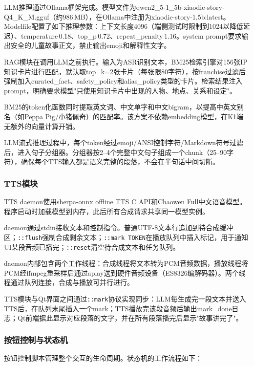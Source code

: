\documentclass[lettersize,journal]{IEEEtran}
\begin{document}
LLM推理通过Ollama框架完成。模型文件为qwen2\_5-1\_5b-xiaodie-story-Q4\_K\_M.gguf（约986\,MB），在Ollama中注册为xiaodie-story-1.5b:latest。Modelfile配置了如下推理参数：上下文长度4096（端侧测试时限制到1024以降低延迟）、temperature\,0.18、top\_p\,0.72、repeat\_penalty\,1.16。system prompt要求输出安全的儿童故事正文，禁止输出emoji和解释性文字。

RAG模块在调用LLM之前执行。输入为ASR识别文本，BM25检索引擎对156张IP知识卡片进行匹配，默认取top\_k=2张卡片（每张限80字符），按franchise过滤后强制加入curated\_fact、safety\_policy和alias\_policy类型的卡片。检索结果注入prompt，明确要求模型"只使用知识卡片中出现的人物、地点、关系和设定"。

BM25的token化函数同时提取英文词、中文单字和中文bigram，以提高中英文别名（如Peppa Pig/小猪佩奇）的匹配率。该方案不依赖embedding模型，在K1端无额外的向量计算开销。

LLM流式推理过程中，每个token经过emoji/ANSI控制字符/Markdown符号过滤后，进入句子分组器。分组器按2--4个完整中文句子组成一个chunk（25--90字符），确保每个TTS输入都是语义完整的段落，不会在半句话中间切断。

\subsubsection{TTS模块}

TTS daemon使用sherpa-onnx offline TTS C API和Chaowen Full中文语音模型。程序启动时加载模型到内存，此后所有合成请求共享同一模型实例。

daemon通过stdin接收文本和控制指令。普通UTF-8文本行追加到待合成缓冲区；\texttt{::flush}强制合成剩余文本；\texttt{::mark TOKEN}在播放队列中插入标记，用于通知UI某段音频已播完；\texttt{::reset}清空待合成文本和任务队列。

daemon内部包含两个工作线程：合成线程将文本转为PCM音频数据，播放线程将PCM经ffmpeg重采样后通过aplay送到硬件音频设备（ES8326编解码器）。两个线程通过队列连接，合成与播放可并行进行。

TTS模块与Qt界面之间通过\texttt{::mark}协议实现同步：LLM每生成完一段文本并送入TTS后，在队列末尾插入一个mark；TTS播放完该段音频后输出mark\_done日志；Qt前端据此显示对应段落的文字，并在所有段落播完后显示"故事讲完了"。

\subsubsection{按钮控制与状态机}

按钮控制脚本管理整个交互的生命周期。状态机的工作流程如下：
\end{document}
